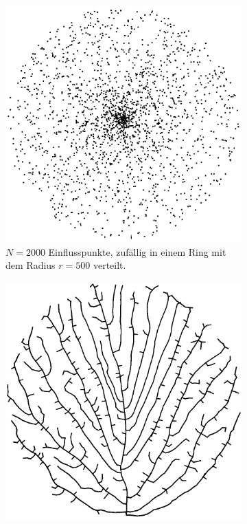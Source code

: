 \begin{figure} [hbtp]
	\centering
	\begin{subfigure}[t]{.4\textwidth}
		\centering
		\includegraphics[width=\linewidth]{images/SCA_Extended1.png}
		\caption{$N=2000$ Einflusspunkte, zufällig in einem Ring mit dem Radius $r = 500$ verteilt.}
		\label{subfig:SCA_Extended1}
	\end{subfigure}
	\hspace{.1\textwidth}
	\begin{subfigure}[t]{.4\textwidth}
		\centering
		\includegraphics[width=\linewidth]{images/SCA_Extended2.png}

\end{subfigure}
\end{figure}
